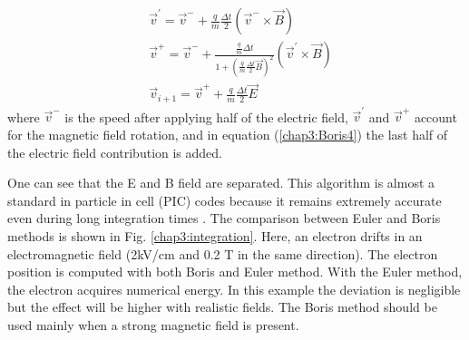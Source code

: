 \begin{refsection}
\begin{align}
     & \vec{v}^{'} = \vec{v}^{-} + \frac{q}{m} \frac{\Delta t}{2}(\vec{v}^{-} \times \vec{B})                                            \\
     & \vec{v}^{+} = \vec{v}^{-} + \frac{\frac{q}{m}\Delta t}{1+(\frac{q}{m} \frac{\Delta t}{2}\vec{B})^{2}}(\vec{v}^{'} \times \vec{B}) \\
     & \vec{v}_{i+1} = \vec{v}^{+} + \frac{q}{m} \frac{\Delta t}{2}\vec{E} \label{chap3:Boris4}
  \end{align}
  where $\vec{v}^{-}$ is the speed after applying half of the electric field, $\vec{v}^{'}$ and $\vec{v}^{+}$ account for the magnetic field rotation, and in equation (\ref{chap3:Boris4}) the last half of the electric field contribution is added.

  One can see that the E and B field are separated. This algorithm is almost a standard in particle in cell (PIC) codes because it remains extremely accurate even during long integration times \cite{Qin2013}. The comparison between Euler and Boris methods is shown in Fig. \ref{chap3:integration}. Here, an electron drifts in an electromagnetic field (2kV/cm and 0.2 T in the same direction). The electron position is computed with both Boris and Euler method. With the Euler method, the electron acquires numerical energy. In this example the deviation is negligible but the effect will be higher with realistic fields. The Boris method should be used mainly when a strong magnetic field is present.


\end{refsection}
